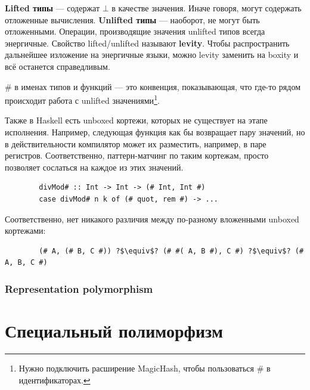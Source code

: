 \documentclass[12pt]{article}
\newcommand{\vocab}[1]{\textbf{#1}} %
\begin{document}
    \vocab{Lifted типы} --- содержат $\bot$ в качестве значения.
    Иначе говоря, могут содержать отложенные вычисления.
    \vocab{Unlifted типы} --- наоборот, не могут быть отложенными.
    Операции, производящие значения unlifted типов всегда энергичные.
    Свойство lifted/unlifted называют \vocab{levity}.
    Чтобы распространить дальнейшее изложение на энергичные языки, можно levity заменить на boxity и всё останется справедливым.

    \# в именах типов и функций --- это конвенция, показывающая, что где-то рядом происходит работа с unlifted значениями\footnote{Нужно подключить расширение MagicHash, чтобы пользоваться \# в идентификаторах.}.

    Также в Haskell есть unboxed кортежи, которых не существует на этапе исполнения.
    Например, следующая функция как бы возвращает пару значений, но в действительности компилятор может их разместить, например, в паре регистров.
    Соответственно, паттерн-матчинг по таким кортежам, просто позволяет сослаться на каждое из этих значений.
    \begin{verbatim}
        divMod# :: Int -> Int -> (# Int, Int #)
        case divMod# n k of (# quot, rem #) -> ...
    \end{verbatim}
    Соответственно, нет никакого различия между по-разному вложенными unboxed кортежами:
    \begin{verbatim}
        (# A, (# B, C #)) ?$\equiv$? (# #( A, B #), C #) ?$\equiv$? (# A, B, C #)
    \end{verbatim}

    \subsubsection{Representation polymorphism}







    \section{Специальный полиморфизм} \label{sec:ad-hoc}



\end{document}
